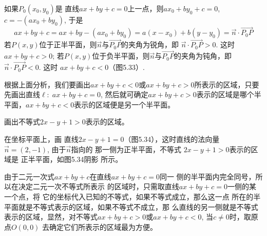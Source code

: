 \begin{figure}[htp]
    \centering
{}
    \caption{}
\end{figure}

如果$P_0(x_0,y_0)$是
直线$ax+by+c=0$上一点，则$ax_0+by_0+c=0$, $c=-(ax_0+by_0)$, 于是
\[ax+by+c=ax+by-(ax_0+by_0)=a(x-x_0)+b(y-y_0)=\vec{n}\cdot \Vec{P_0P}\]
若$P(x,y)$位于正半平面，则$\vec{n}$与$\Vec{P_0P}$的夹角为锐角，即
$\vec{n}\cdot \Vec{P_0P}>0$. 这时$ax+by+c>0$; 若$P(x,y)$位于负半平面，则$\vec{n}$与$\Vec{P_0P}$的夹角为钝角，即$\vec{n}\cdot \Vec{P_0P}<0$. 这时
$ax+by+c<0$（图5.33）.

根据上面分析，我们要画出$ax+by+c<0$或$ax+by
+c> 0$所表示的区域，只要先画出直线$\ell:\; ax+by+c=0$, 
然后就可确定$ax+by+c>0$表示的区域是哪个半平面，$ax
+by+c<0$表示的区域便是另一个半平面。

\begin{example}
    画出不等式$2x-y+1>0$表示的区域。
\end{example}

\begin{solution}
在坐标平面上，画
直线$2x-y+1=0$（图5.34），这时直线的法向量
$\vec{n}=(2,-1)$, 由于$\vec{n}$指向的
那一侧为正半平面，不等式
$2x-y+1>0$表示的区域是
正半平面，如图5.34阴影
所示。

由于二元一次式$ax+by+c$在直线$ax+by+c=0$同一
侧的半平面内完全同号，所以在决定二元一次不等式所表示
的区域时，只需取直线$ax+by+c=0$一侧的某一个点，将
它的坐标代入已知的不等式，如果不等式成立，那么这一点
所在的半平面就是不等式表示的区域，如果不等式不成立，那
么直线的另一侧就是不等式表示的区域，显然，对不等式$ax
+by+c>0$或$ax+by+c<0$, 当$c\ne 0$时，取原点$O(0,0)$
去确定它们所表示的区域最为方便。
\end{solution}


